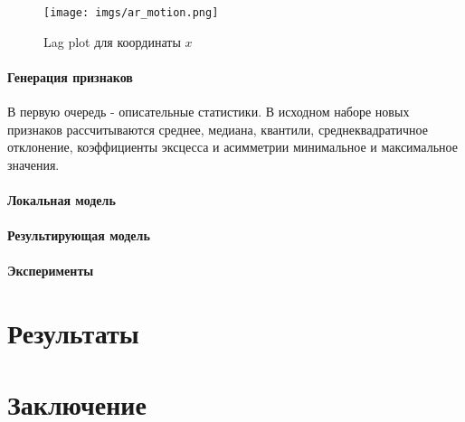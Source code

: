 \documentclass{mipt-thesis-bs}
\begin{document}
\begin{figure}[h]

\begin{center}
	\texttt{[image: imgs/ar\_motion.png]}	
	\caption{Lag plot для координаты $x$}	
	\label{fig:ar_motion}
	\end{center}
\end{figure}

\subsubsection{Генерация признаков}
В первую очередь - описательные статистики. В исходном наборе новых признаков рассчитываются среднее, медиана, квантили, среднеквадратичное отклонение, коэффициенты эксцесса и асимметрии минимальное и максимальное значения.
\subsubsection{Локальная модель}
\subsubsection{Результирующая модель}
\subsubsection{Эксперименты}



\chapter{Результаты}



\chapter{Заключение}
\end{document}
